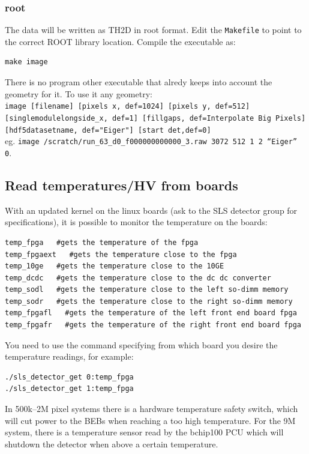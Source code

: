 \documentclass{article}
\begin{document}
\subsubsection{root}
The data will be written as TH2D in root format. Edit the {\tt{Makefile}} to point to the correct ROOT library location. Compile the executable as:
\begin{verbatim}
make image 
\end{verbatim}
There is no program other executable that alredy keeps into account the geometry for it.
To use it any geometry:\\
{\tt{image [filename] [pixels x, def=1024] [pixels y, def=512] [singlemodulelongside\_x, def=1] [fillgaps, def=Interpolate Big Pixels] [hdf5datasetname, def="Eiger"] [start det,def=0]}}\\
eg.
{\tt image /scratch/run\_63\_d0\_f000000000000\_3.raw  3072 512 1 2 ``Eiger'' 0}.\\

\subsection{Read temperatures/HV from boards}

With an updated kernel on the linux boards (ask to the SLS detector group for specifications), it is possible to monitor the temperature on the boards: 
\begin{verbatim}
temp_fpga   #gets the temperature of the fpga
temp_fpgaext   #gets the temperature close to the fpga
temp_10ge   #gets the temperature close to the 10GE
temp_dcdc   #gets the temperature close to the dc dc converter
temp_sodl   #gets the temperature close to the left so-dimm memory
temp_sodr   #gets the temperature close to the right so-dimm memory
temp_fpgafl   #gets the temperature of the left front end board fpga
temp_fpgafr   #gets the temperature of the right front end board fpga

\end{verbatim}

You need to use the command specifying from which board you desire the temperature readings, for example:
\begin{verbatim}
./sls_detector_get 0:temp_fpga
./sls_detector_get 1:temp_fpga
\end{verbatim}
In 500k--2M pixel systems there is a hardware temperature safety switch, which will cut power to the BEBs when reaching a too high temperature. For the 9M system, there is a temperature sensor read by the bchip100 PCU which will shutdown the detector when above a certain temperature.
 
\end{document}
